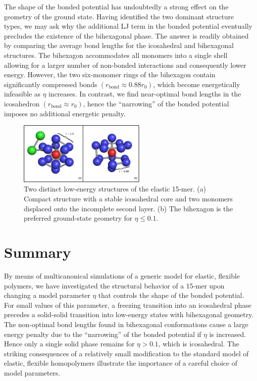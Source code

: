 \documentclass[12pt]{report}
\begin{document}
The shape of the bonded potential has undoubtedly a strong effect on
the geometry of the ground state. Having identified the two dominant
structure types, we may ask why the additional LJ term in the bonded
potential eventually precludes the existence of the bihexagonal phase. The
answer is readily obtained by comparing the average bond lengths for the
icosahedral and bihexagonal structures. The bihexagon accommodates all
monomers into a single shell allowing for a larger number of non-bonded
interactions and consequently lower energy. However, the two six-monomer
rings of the bihexagon contain significantly compressed bonds
$(r_{\mathrm{bond}} \approx 0.88 r_{0})$, which become energetically
infeasible as $\eta$ increases. In contrast, we find near-optimal bond
lengths in the icosahedron $(r_{\mathrm{bond}} \approx  r_{0})$, hence the
``narrowing'' of the bonded potential imposes no additional energetic
penalty.
%
\begin{figure}
\begin{center}
	\includegraphics[trim = 0 0 0 0, clip,width=0.55\textwidth]
	{chapter6Figs/configurations.eps}
\hspace{2pc}%
\begin{minipage}[b]{14pc}
\caption{\label{Structures} Two distinct low-energy structures of
the elastic 15-mer. (a) Compact structure with a stable icosahedral core
and two monomers displaced onto the incomplete second layer. (b) The
bihexagon is the preferred ground-state geometry for $\eta \leq 0.1$.}
\end{minipage}
\end{center}
\end{figure}
%
\section{Summary}
%
By means of multicanonical simulations of a generic model for elastic,
flexible polymers, we have investigated the structural behavior of a 15-mer
upon changing a model parameter $\eta$
that controls the shape of the bonded potential. For small values of
this parameter, a freezing transition into an icosahedral phase precedes a
solid-solid transition into low-energy states with
bihexagonal geometry. The non-optimal bond lengths found in bihexagonal
conformations cause a large energy penalty due to the ``narrowing'' of the
bonded potential if $\eta$ is increased. Hence only a single
solid phase remains for $\eta > 0.1$, which is icosahedral. The striking
consequences of a relatively small modification to the standard model of
elastic, flexible homopolymers illustrate the importance of a careful
choice of model parameters.
\end{document}
